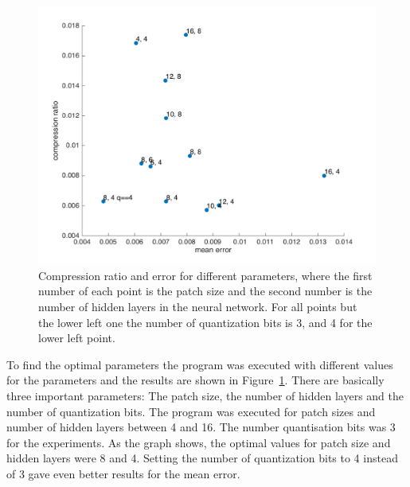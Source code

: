 \begin{figure}[tbp]
  \centering
  \includegraphics[width=\columnwidth]{images/optParams}
  \caption{Compression ratio and error for different parameters, where the first number of each point is the patch size and the second number is the number of hidden layers in the neural network. For all points but the lower left one the number of quantization bits is 3, and 4 for the lower left point.}
  \label{fig:optParams}
\end{figure}

\newline
To find the optimal parameters the program was executed with different values for the parameters and the results are shown in Figure~\ref{fig:optParams}. There are basically three important parameters: The patch size, the number of hidden layers and the number of quantization bits. The program was executed for patch sizes and number of hidden layers between 4 and 16. The number quantisation bits was 3 for the experiments. As the graph shows, the optimal values for patch size and hidden layers were 8 and 4. Setting the number of quantization bits to 4 instead of 3 gave even better results for the mean error.   


